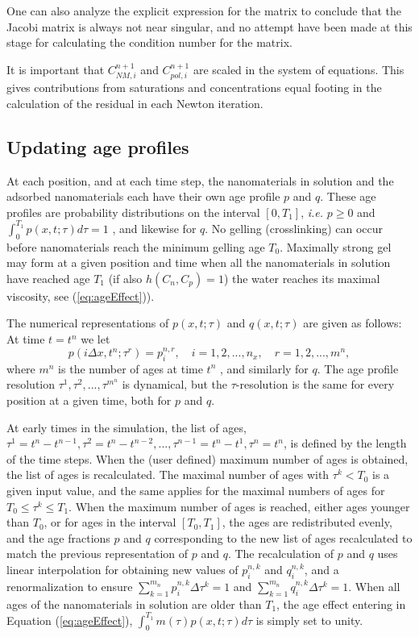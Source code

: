 \documentclass[energies,article,submit,moreauthors,pdftex]{Definitions/mdpi}
\begin{document}
One can also analyze the explicit expression for the matrix to conclude that the Jacobi matrix is always not near singular, and no attempt have been made at this stage for calculating the condition number for the matrix.

It is important that  $C^{n+1}_{\textit{NM}, i}$ and $C^{n+1}_{pol, i}$ are scaled in the system of equations. This gives contributions from saturations and concentrations equal footing in the calculation of the residual in each Newton iteration.

\subsection{Updating age profiles}
At each position, and at each time step, the nanomaterials in solution and the adsorbed nanomaterials each have their own age profile $p$ and $q$. These age profiles are probability distributions on the interval $[0,T_1]$, \textit{i.e.} $p\geq0$  and $\int^{T_1}_0 p(x,t;\tau)d\tau=1$  , and likewise for  $q$. No gelling (crosslinking) can occur before nanomaterials reach the minimum gelling age  $T_0$. Maximally strong gel may form at a given position and time when all the nanomaterials in solution have reached age $T_1$ (if also $h(C_n,C_p)=1$) the water reaches its maximal viscosity, see (\ref{eq:ageEffect})).

The numerical representations of $p(x,t;\tau)$ and $q(x,t;\tau)$ are given as follows: At time $t=t^n$ we let
\begin{equation}
    p(i\Delta x,t^n;\tau^r)=p^{n,r}_i, \quad i=1,2,...,n_x, \quad r=1,2,...,m^n,
\end{equation}
where $m^n$ is the number of ages at time $t^n$ , and similarly for $q$. The age profile resolution $\tau^1,\tau^2,...,\tau^{m^n}$ is dynamical, but the  $\tau$-resolution is the same for every position at a given time, both for $p$ and $q$.

At early times in the simulation, the list of ages, $\tau^1=t^n-t^{n-1},\tau^2=t^n-t^{n-2},...,\tau^{n-1}=t^n-t^1, \tau^{n}=t^n$, is defined by the length of the time steps. When the (user defined) maximum number of ages is obtained, the list of ages is recalculated. The maximal number of ages with $\tau^k<T_0$  is a given input value, and the same applies for the maximal numbers of ages for  $T_0\leq\tau^k\leq T_1$. When the maximum number of ages is reached, either ages younger than  $T_0$, or for ages in the interval $[T_0,T_1]$, the ages are redistributed evenly, and the age fractions $p$ and $q$ corresponding to the new list of ages recalculated to match the previous representation of $p$ and $q$. The recalculation of $p$ and $q$ uses linear interpolation for obtaining new values of  $p^{n,k}_i$ and $q^{n,k}_i$, and a renormalization to ensure $\sum^{m_n}_{k=1} p_i^{n,k}\Delta\tau^k=1$  and  $\sum^{m_n}_{k=1} q_i^{n,k}\Delta\tau^k=1$. When all ages of the nanomaterials in solution are older than $T_1$, the age effect entering in Equation (\ref{eq:ageEffect}), $\int^{T_1}_{0} m(\tau)p(x,t;\tau)d\tau$ is simply set to unity.
\end{document}
